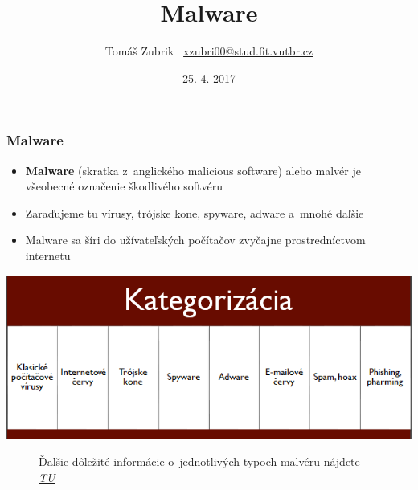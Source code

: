 \documentclass{beamer}
\title{Malware}
\author{\texorpdfstring{Tomáš Zubrik \ \newline\url{xzubri00@stud.fit.vutbr.cz}}{Author}}
\institute{Vysoké učení technické v~Brně \\Fakulta informačních technológií}
\date{25. 4. 2017}
\begin{document}
\begin{frame}
\titlepage
\end{frame}
\begin{frame}
\frametitle{Malware}
\begin{itemize}
\item{\textbf{Malware} (skratka z~anglického malicious software) alebo malvér je
všeobecné označenie škodlivého softvéru}
\item{Zaraďujeme tu vírusy, trójske kone, spyware, adware a~mnohé ďaľšie}
\item{Malware sa šíri do užívateľských počítačov zvyčajne prostredníctvom internetu}

\end{itemize}
\end{frame}

\begin{frame}
\includegraphics[scale=0.95]{malware_kategorizacia.png}
\begin{figure}[H]
Ďalšie dôležité informácie o~jednotlivých typoch malvéru nájdete \href{https://sk.wikipedia.org/wiki/Malware}{\textit{TU}}
\end{figure}
\end{frame}
\end{document}
